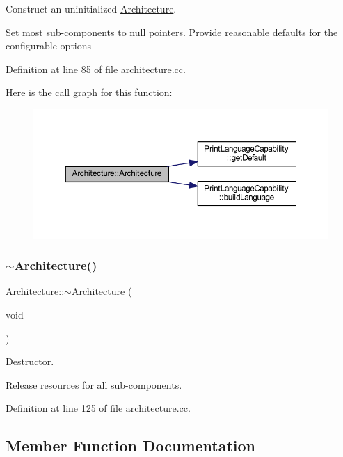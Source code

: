 Construct an uninitialized \mbox{\hyperlink{class_architecture}{Architecture}}. 

Set most sub-\/components to null pointers. Provide reasonable defaults for the configurable options 

Definition at line 85 of file architecture.\+cc.

Here is the call graph for this function\+:
\nopagebreak
\begin{figure}[H]
\begin{center}
\leavevmode
\includegraphics[width=350pt]{class_architecture_aea7049f03a24618ef02d876b0659f67d_cgraph}
\end{center}
\end{figure}
\mbox{\label{class_architecture_aaef3c8d834e7f5c22db0cf15eefc7e45}} 
\subsubsection{\texorpdfstring{$\sim$Architecture()}{~Architecture()}}
{\footnotesize\ttfamily Architecture\+::$\sim$\+Architecture (\begin{DoxyParamCaption}\item[{void}]{ }\end{DoxyParamCaption})\hspace{0.3cm}{\ttfamily [virtual]}}



Destructor. 

Release resources for all sub-\/components. 

Definition at line 125 of file architecture.\+cc.



\subsection{Member Function Documentation}
\mbox{\label{class_architecture_a70efc8f5d9e212d039dccbfe8556f05d}} 
